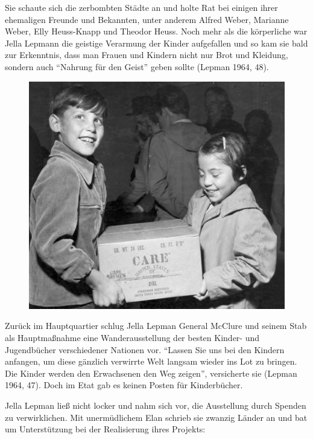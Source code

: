 \documentclass[a4paper,
fontsize=11pt,
oneside,
numbers=noperiodatend,
parskip=half-,
bibliography=totoc,
final
]{scrartcl}
\begin{document}
Sie schaute sich die zerbombten Städte an und holte Rat bei einigen
ihrer ehemaligen Freunde und Bekannten, unter anderem Alfred Weber,
Marianne Weber, Elly Heuss-Knapp und Theodor Heuss. Noch mehr als die
körperliche war Jella Lepmann die geistige Verarmung der Kinder
aufgefallen und so kam sie bald zur Erkenntnis, dass man Frauen und
Kindern nicht nur Brot und Kleidung, sondern auch \enquote{Nahrung für
den Geist} geben sollte (Lepman 1964, 48).~

\begin{figure}[htbp]
\centering
\includegraphics{img/bild3.jpg}
\end{figure}

Zurück im Hauptquartier schlug Jella Lepman General McClure und seinem
Stab als Hauptmaßnahme eine Wanderausstellung der besten Kinder- und
Jugendbücher verschiedener Nationen vor. \enquote{Lassen Sie uns bei den
Kindern anfangen, um diese gänzlich verwirrte Welt langsam wieder ins
Lot zu bringen. Die Kinder werden den Erwachsenen den Weg zeigen},
versicherte sie (Lepman 1964, 47). Doch im Etat gab es keinen Posten für
Kinderbücher.

Jella Lepman ließ nicht locker und nahm sich vor, die Ausstellung durch
Spenden zu verwirklichen. Mit unermüdlichem Elan schrieb sie zwanzig
Länder an und bat um Unterstützung bei der Realisierung ihres Projekts:
\end{document}
